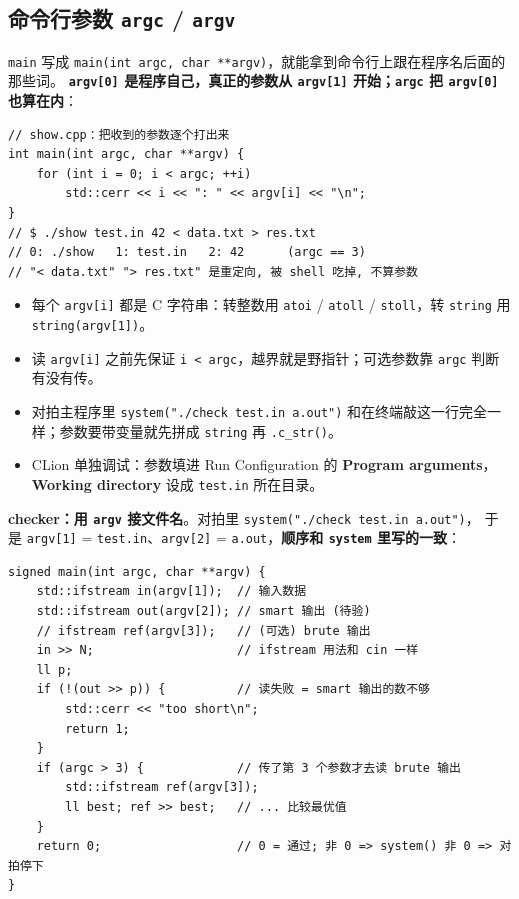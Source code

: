 	\subsection{命令行参数 \texttt{argc} / \texttt{argv}}

	\texttt{main} 写成 \texttt{main(int argc, char **argv)}，就能拿到命令行上跟在程序名后面的那些词。
	\textbf{\texttt{argv[0]} 是程序自己，真正的参数从 \texttt{argv[1]} 开始；\texttt{argc} 把 \texttt{argv[0]} 也算在内}：

	\begin{verbatim}
// show.cpp：把收到的参数逐个打出来
int main(int argc, char **argv) {
	for (int i = 0; i < argc; ++i)
		std::cerr << i << ": " << argv[i] << "\n";
}
// $ ./show test.in 42 < data.txt > res.txt
// 0: ./show   1: test.in   2: 42      (argc == 3)
// "< data.txt" "> res.txt" 是重定向, 被 shell 吃掉, 不算参数
	\end{verbatim}

	\begin{itemize}
		\item 每个 \texttt{argv[i]} 都是 C 字符串：转整数用 \texttt{atoi} / \texttt{atoll} / \texttt{stoll}，转 \texttt{string} 用 \texttt{string(argv[1])}。
		\item 读 \texttt{argv[i]} 之前先保证 \texttt{i < argc}，越界就是野指针；可选参数靠 \texttt{argc} 判断有没有传。
		\item 对拍主程序里 \texttt{system("./check test.in a.out")} 和在终端敲这一行完全一样；参数要带变量就先拼成 \texttt{string} 再 \texttt{.c\_str()}。
		\item CLion 单独调试：参数填进 Run Configuration 的 \textbf{Program arguments}，\textbf{Working directory} 设成 \texttt{test.in} 所在目录。
	\end{itemize}

	\textbf{checker：用 \texttt{argv} 接文件名}。对拍里 \texttt{system("./check test.in a.out")}，
	于是 \texttt{argv[1]} = \texttt{test.in}、\texttt{argv[2]} = \texttt{a.out}，\textbf{顺序和 \texttt{system} 里写的一致}：

	\begin{verbatim}
signed main(int argc, char **argv) {
	std::ifstream in(argv[1]);  // 输入数据
	std::ifstream out(argv[2]); // smart 输出 (待验)
	// ifstream ref(argv[3]);   // (可选) brute 输出
	in >> N;                    // ifstream 用法和 cin 一样
	ll p;
	if (!(out >> p)) {          // 读失败 = smart 输出的数不够
		std::cerr << "too short\n";
		return 1;
	}
	if (argc > 3) {             // 传了第 3 个参数才去读 brute 输出
		std::ifstream ref(argv[3]);
		ll best; ref >> best;   // ... 比较最优值
	}
	return 0;                   // 0 = 通过; 非 0 => system() 非 0 => 对拍停下
}
	\end{verbatim}

